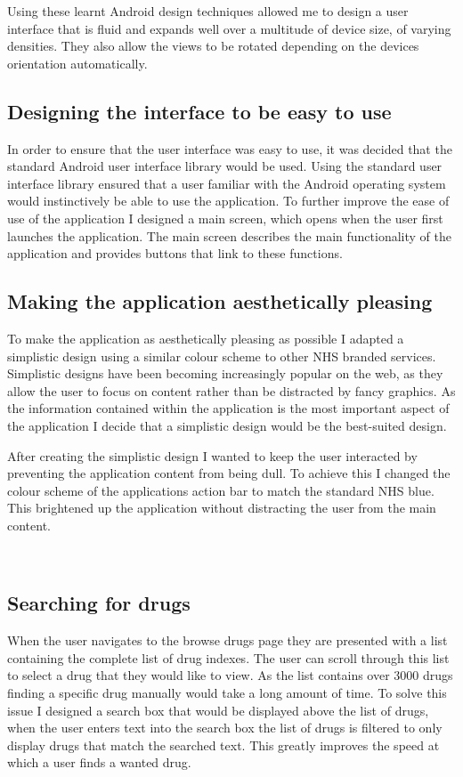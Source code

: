 Using these learnt Android design techniques allowed me to design a user interface that is fluid and expands well over a multitude of device size, of varying densities. They also allow the views to be rotated depending on the devices orientation automatically.

\subsection{Designing the interface to be easy to use}

In order to ensure that the user interface was easy to use, it was decided that the standard Android user interface library would be used. Using the standard user interface library \cite{android_design} ensured that a user familiar with the Android operating system would instinctively be able to use the application. To further improve the ease of use of the application I designed a main screen, which opens when the user first launches the application. The main screen describes the main functionality of the application and provides buttons that link to these functions.

\subsection{Making the application aesthetically pleasing}

To make the application as aesthetically pleasing as possible I adapted a simplistic design using a similar colour scheme to other NHS branded services. Simplistic designs have been becoming increasingly popular on the web, as they allow the user to focus on content rather than be distracted by fancy graphics. As the information contained within the application is the most important aspect of the application I decide that a simplistic design would be the best-suited design.

After creating the simplistic design I wanted to keep the user interacted by preventing the application content from being dull. To achieve this I changed the colour scheme of the applications action bar to match the standard NHS \cite{nhs} blue. This brightened up the application without distracting the user from the main content.

 
\subsection{Searching for drugs}
When the user navigates to the browse drugs page they are presented with a list containing the complete list of drug indexes. The user can scroll through this list to select a drug that they would like to view. As the list contains over 3000 drugs finding a specific drug manually would take a long amount of time. To solve this issue I designed a search box that would be displayed above the list of drugs, when the user enters text into the search box the list of drugs is filtered to only display drugs that match the searched text. This greatly improves the speed at which a user finds a wanted drug.

